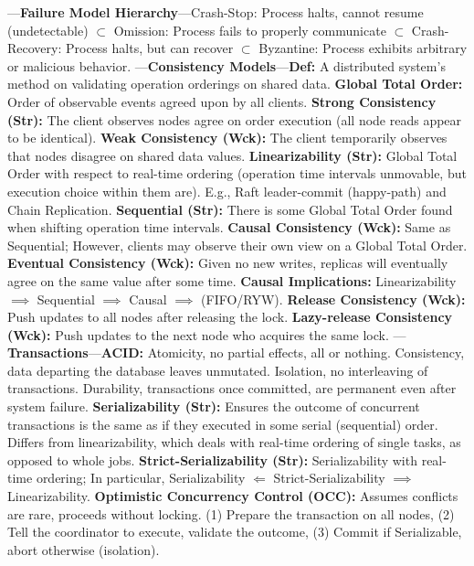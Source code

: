 \newpage 

\begin{multicols}{2}

\noindent
---\textbf{Failure Model Hierarchy}---Crash-Stop: Process halts, cannot resume (undetectable) $\subset$ Omission: Process fails to properly communicate $\subset$ Crash-Recovery: Process halts, but can recover $\subset$ Byzantine: Process exhibits arbitrary or malicious behavior.
---\textbf{Consistency Models}---\textbf{Def:} A distributed system's method on validating operation orderings on shared data.
\textbf{Global Total Order:} Order of observable events agreed upon by all clients. \textbf{Strong Consistency (Str):} The client observes nodes agree on order execution (all node reads appear to be identical).
\textbf{Weak Consistency (Wck):} The client temporarily observes that nodes disagree on shared data values.
\textbf{Linearizability (Str):} Global Total Order with respect to real-time ordering (operation time intervals unmovable, but execution choice within them are). E.g., Raft leader-commit (happy-path) and Chain Replication.
\textbf{Sequential (Str):} There is some Global Total Order found when shifting operation time intervals.
\textbf{Causal Consistency (Wck):} Same as Sequential; However, clients may observe their own view on a Global Total Order.
\textbf{Eventual Consistency (Wck):} Given no new writes, replicas will eventually agree on the same value after some time.
\textbf{Causal Implications:} Linearizability $\implies$ Sequential $\implies$ Causal $\implies$ (FIFO/RYW).
\textbf{Release Consistency (Wck):} Push updates to all nodes after releasing the lock. 
\textbf{Lazy-release Consistency (Wck):} Push updates to the next node who acquires the same lock.
---\textbf{Transactions}---\textbf{ACID:} Atomicity, no partial effects, all or nothing. Consistency, data departing the database leaves unmutated. Isolation, no interleaving of transactions.
Durability, transactions once committed, are permanent even after system failure.
\textbf{Serializability (Str):} Ensures the outcome of concurrent transactions is the same as if they executed in some serial (sequential) order. Differs from 
linearizability, which deals with real-time ordering of single tasks, as opposed to whole jobs. 
\textbf{Strict-Serializability (Str):} Serializability with real-time ordering; In particular, Serializability $\Longleftarrow$ Strict-Serializability $\implies$ Linearizability.
\textbf{Optimistic Concurrency Control (OCC):} Assumes conflicts are rare, proceeds without locking. (1) Prepare the transaction on all nodes, (2) Tell the coordinator to execute, validate the outcome, (3) Commit if Serializable, abort otherwise (isolation).

\end{multicols}
